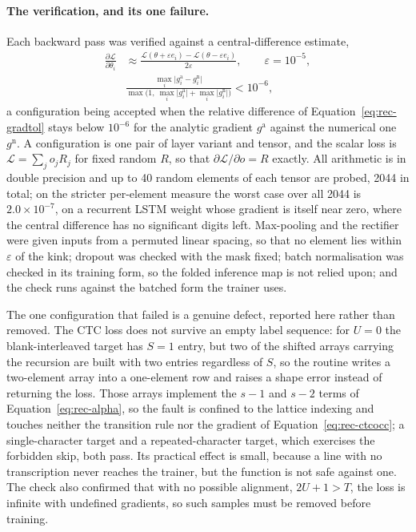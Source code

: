 \paragraph{The verification, and its one failure.}
Each backward pass was verified against a central-difference estimate,
\begin{align}
\frac{\partial\mathcal L}{\partial\theta_i}&\approx\frac{\mathcal L(\theta+\varepsilon e_i)-\mathcal L(\theta-\varepsilon e_i)}{2\varepsilon},\qquad\varepsilon=10^{-5},\label{eq:rec-gradcheck}\\
&\frac{\max_i\lvert g_i^{\mathrm{a}}-g_i^{\mathrm{n}}\rvert}{\max\bigl(1,\ \max_i\lvert g_i^{\mathrm{a}}\rvert+\max_i\lvert g_i^{\mathrm{n}}\rvert\bigr)}<10^{-6},\label{eq:rec-gradtol}
\end{align}
a configuration being accepted when the relative difference of Equation~\ref{eq:rec-gradtol} stays below $10^{-6}$ for the analytic gradient $g^{\mathrm a}$ against the numerical one $g^{\mathrm n}$. A configuration is one pair of layer variant and tensor, and the scalar loss is $\mathcal L=\sum_j o_jR_j$ for fixed random $R$, so that $\partial\mathcal L/\partial o=R$ exactly. All arithmetic is in double precision and up to 40 random elements of each tensor are probed, 2044 in total; on the stricter per-element measure the worst case over all 2044 is $2.0\times10^{-7}$, on a recurrent LSTM weight whose gradient is itself near zero, where the central difference has no significant digits left. Max-pooling and the rectifier were given inputs from a permuted linear spacing, so that no element lies within $\varepsilon$ of the kink; dropout was checked with the mask fixed; batch normalisation was checked in its training form, so the folded inference map is not relied upon; and the check runs against the batched form the trainer uses.

The one configuration that failed is a genuine defect, reported here rather than removed. The CTC loss does not survive an empty label sequence: for $U=0$ the blank-interleaved target has $S=1$ entry, but two of the shifted arrays carrying the recursion are built with two entries regardless of $S$, so the routine writes a two-element array into a one-element row and raises a shape error instead of returning the loss. Those arrays implement the $s-1$ and $s-2$ terms of Equation~\ref{eq:rec-alpha}, so the fault is confined to the lattice indexing and touches neither the transition rule nor the gradient of Equation~\ref{eq:rec-ctcocc}; a single-character target and a repeated-character target, which exercises the forbidden skip, both pass. Its practical effect is small, because a line with no transcription never reaches the trainer, but the function is not safe against one. The check also confirmed that with no possible alignment, $2U+1>T$, the loss is infinite with undefined gradients, so such samples must be removed before training.


